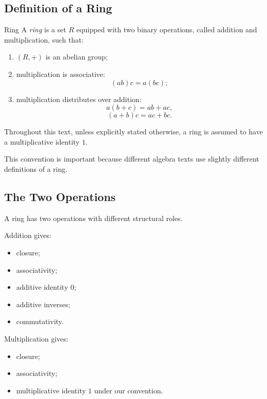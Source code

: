 \subsection{Definition of a Ring}
\label{subsec:definition-ring}

\begin{definitionbox}{Ring}
A \emph{ring} is a set \(R\) equipped with two binary operations, called
addition and multiplication, such that:

\begin{enumerate}
    \item \((R,+)\) is an abelian group;
    \item multiplication is associative:
    \[ (ab)c=a(bc); \]
    \item multiplication distributes over addition:
    \[ a(b+c)=ab+ac, \]
    \[ (a+b)c=ac+bc. \]
\end{enumerate}
\end{definitionbox}

Throughout this text, unless explicitly stated otherwise, a ring is assumed to
have a multiplicative identity \(1\).

This convention is important because different algebra texts use slightly
different definitions of a ring.

\subsection{The Two Operations}
\label{subsec:ring-two-operations}

A ring has two operations with different structural roles.

Addition gives:

\begin{itemize}
    \item closure;
    \item associativity;
    \item additive identity \(0\);
    \item additive inverses;
    \item commutativity.
\end{itemize}

Multiplication gives:

\begin{itemize}
    \item closure;
    \item associativity;
    \item multiplicative identity \(1\) under our convention.
\end{itemize}


